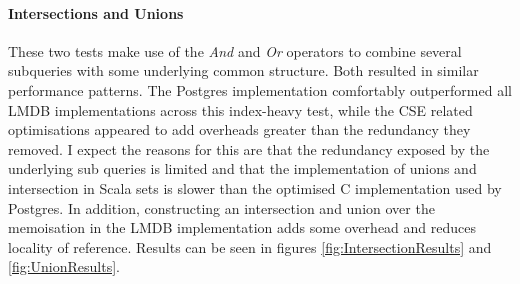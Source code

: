 \documentclass[12pt,a4paper,twoside,openright]{report}
\newcommand\mathName[1]{\textit{#1}}
\begin{document}
		\paragraph{Intersections and Unions}
	These two tests make use of the \mathName{And} and  \mathName{Or} operators to combine several subqueries with some underlying common structure. Both resulted in similar performance patterns. The Postgres implementation comfortably outperformed all LMDB implementations across this index-heavy test, while the CSE related optimisations appeared to add overheads greater than the redundancy they removed. I expect the reasons for this are that the redundancy exposed by the underlying sub queries is limited and that the implementation of unions and intersection in Scala sets is slower than the optimised C implementation used by Postgres. In addition, constructing an intersection and union over the memoisation in the LMDB implementation adds some overhead and reduces locality of reference.	Results can be seen in figures \ref{fig:IntersectionResults} and \ref{fig:UnionResults}.
\end{document}
